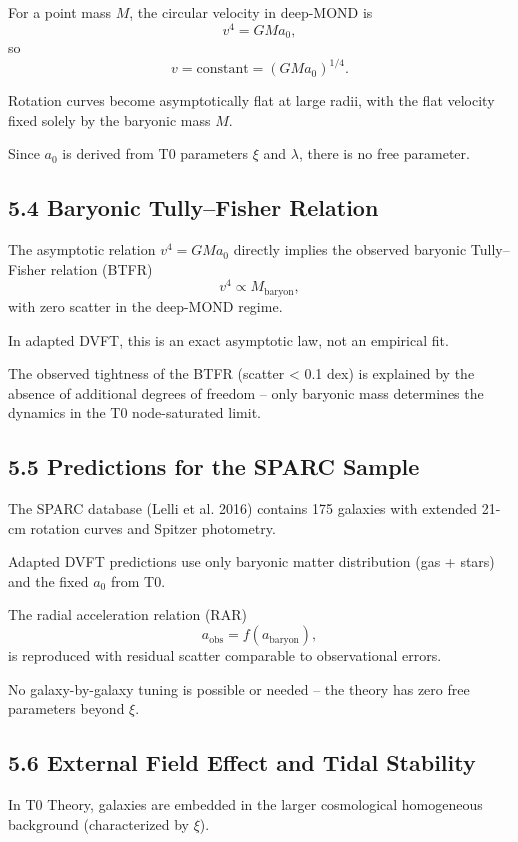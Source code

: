 	For a point mass $M$, the circular velocity in deep-MOND is
	\[
	v^4 = G M a_0,
	\]
	so
	\[
	v = \text{constant} = (G M a_0)^{1/4}.
	\]
	
	Rotation curves become asymptotically flat at large radii, with the flat velocity fixed solely by the baryonic mass $M$.
	
	Since $a_0$ is derived from T0 parameters $\xi$ and $\lambda$, there is no free parameter.
	
	\subsection{5.4 Baryonic Tully–Fisher Relation}
	
	The asymptotic relation $v^4 = G M a_0$ directly implies the observed baryonic Tully–Fisher relation (BTFR)
	\[
	v^4 \propto M_{\text{baryon}},
	\]
	with zero scatter in the deep-MOND regime.
	
	In adapted DVFT, this is an exact asymptotic law, not an empirical fit.
	
	The observed tightness of the BTFR (scatter < 0.1 dex) is explained by the absence of additional degrees of freedom – only baryonic mass determines the dynamics in the T0 node-saturated limit.
	
	\subsection{5.5 Predictions for the SPARC Sample}
	
	The SPARC database (Lelli et al. 2016) contains 175 galaxies with extended 21-cm rotation curves and Spitzer photometry.
	
	Adapted DVFT predictions use only baryonic matter distribution (gas + stars) and the fixed $a_0$ from T0.
	
	The radial acceleration relation (RAR)
	\[
	a_{\text{obs}} = f(a_{\text{baryon}}),
	\]
	is reproduced with residual scatter comparable to observational errors.
	
	No galaxy-by-galaxy tuning is possible or needed – the theory has zero free parameters beyond $\xi$.
	
	\subsection{5.6 External Field Effect and Tidal Stability}
	
	In T0 Theory, galaxies are embedded in the larger cosmological homogeneous background (characterized by $\xi$).
	
